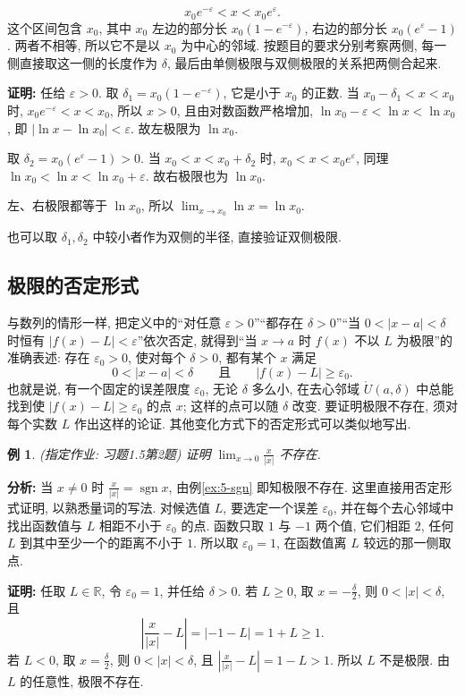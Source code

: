 \documentclass[UTF8,openany]{ctexbook}
\theoremstyle{chinesetextbook}
\newtheorem{example}{例}[section]
\newenvironment{cnproof}{\par\indent\textbf{证明:} \ignorespaces}{\par}
\begin{document}
\[
x_0e^{-\varepsilon}<x<x_0e^{\varepsilon}.
\]
这个区间包含 $x_0$, 其中 $x_0$ 左边的部分长 $x_0(1-e^{-\varepsilon})$, 右边的部分长 $x_0(e^\varepsilon-1)$. 两者不相等, 所以它不是以 $x_0$ 为中心的邻域. 按题目的要求分别考察两侧, 每一侧直接取这一侧的长度作为 $\delta$, 最后由单侧极限与双侧极限的关系把两侧合起来.
\begin{cnproof}
任给 $\varepsilon>0$. 取 $\delta_1=x_0(1-e^{-\varepsilon})$, 它是小于 $x_0$ 的正数. 当 $x_0-\delta_1<x<x_0$ 时, $x_0e^{-\varepsilon}<x<x_0$, 所以 $x>0$, 且由对数函数严格增加, $\ln x_0-\varepsilon<\ln x<\ln x_0$, 即 $|\ln x-\ln x_0|<\varepsilon$. 故左极限为 $\ln x_0$.

取 $\delta_2=x_0(e^{\varepsilon}-1)>0$. 当 $x_0<x<x_0+\delta_2$ 时, $x_0<x<x_0e^{\varepsilon}$, 同理 $\ln x_0<\ln x<\ln x_0+\varepsilon$. 故右极限也为 $\ln x_0$.

左、右极限都等于 $\ln x_0$, 所以 $\displaystyle\lim_{x\to x_0}\ln x=\ln x_0$.
\end{cnproof}
也可以取 $\delta_1,\delta_2$ 中较小者作为双侧的半径, 直接验证双侧极限.
\subsection{极限的否定形式}
与数列的情形一样, 把定义中的“对任意 $\varepsilon>0$”“都存在 $\delta>0$”“当 $0<|x-a|<\delta$ 时恒有 $|f(x)-L|<\varepsilon$”依次否定, 就得到“当 $x\to a$ 时 $f(x)$ 不以 $L$ 为极限”的准确表述: 存在 $\varepsilon_0>0$, 使对每个 $\delta>0$, 都有某个 $x$ 满足
\[
0<|x-a|<\delta\qquad\text{且}\qquad|f(x)-L|\ge\varepsilon_0.
\]
也就是说, 有一个固定的误差限度 $\varepsilon_0$, 无论 $\delta$ 多么小, 在去心邻域 $\mathring U(a,\delta)$ 中总能找到使 $|f(x)-L|\ge\varepsilon_0$ 的点 $x$; 这样的点可以随 $\delta$ 改变. 要证明极限不存在, 须对每个实数 $L$ 作出这样的论证. 其他变化方式下的否定形式可以类似地写出.
\begin{example}
\textnormal{(指定作业: 习题1.5第2题)} 证明 $\displaystyle\lim_{x\to0}\frac x{|x|}$ 不存在.
\end{example}
\par\indent\textbf{分析:} 当 $x\ne0$ 时 $\displaystyle\frac x{|x|}=\operatorname{sgn}x$, 由例\ref{ex:5-sgn} 即知极限不存在. 这里直接用否定形式证明, 以熟悉量词的写法. 对候选值 $L$, 要选定一个误差 $\varepsilon_0$, 并在每个去心邻域中找出函数值与 $L$ 相距不小于 $\varepsilon_0$ 的点. 函数只取 $1$ 与 $-1$ 两个值, 它们相距 $2$, 任何 $L$ 到其中至少一个的距离不小于 $1$. 所以取 $\varepsilon_0=1$, 在函数值离 $L$ 较远的那一侧取点.
\begin{cnproof}
任取 $L\in\mathbb R$, 令 $\varepsilon_0=1$, 并任给 $\delta>0$. 若 $L\ge0$, 取 $\displaystyle x=-\frac\delta2$, 则 $0<|x|<\delta$, 且
\[
\left|\frac x{|x|}-L\right|=|-1-L|=1+L\ge1.
\]
若 $L<0$, 取 $\displaystyle x=\frac\delta2$, 则 $0<|x|<\delta$, 且 $\displaystyle\left|\frac x{|x|}-L\right|=1-L>1$. 所以 $L$ 不是极限. 由 $L$ 的任意性, 极限不存在.
\end{cnproof}
\end{document}
